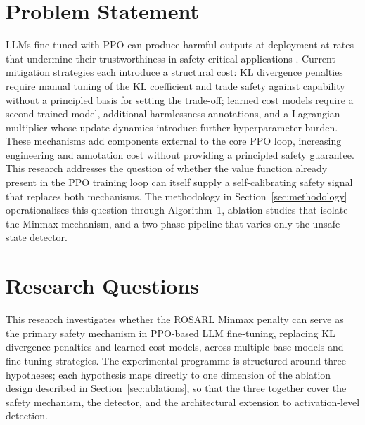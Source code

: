 \documentclass[a4paper,twoside,12pt]{report}
\begin{document}
\section{Problem Statement}
\label{sec:problem-statement}

LLMs fine-tuned with PPO can produce harmful outputs at deployment at rates that undermine
their trustworthiness in safety-critical applications \citep{dai2024saferlhf,
chittepu2025}. Current mitigation strategies each introduce a structural cost: KL
divergence penalties require manual tuning of the KL coefficient and trade safety against
capability without a principled basis for setting the trade-off; learned cost models
require a second trained model, additional harmlessness annotations, and a Lagrangian
multiplier whose update dynamics introduce further hyperparameter burden. These mechanisms
add components external to the core PPO loop, increasing engineering and annotation cost
without providing a principled safety guarantee. This research addresses the question of
whether the value function already present in the PPO training loop can itself supply a
self-calibrating safety signal that replaces both mechanisms. The methodology in
Section~\ref{sec:methodology} operationalises this question through Algorithm~1, ablation
studies that isolate the Minmax mechanism, and a two-phase pipeline that varies only the
unsafe-state detector.

\section{Research Questions}
\label{sec:research-questions}

This research investigates whether the ROSARL Minmax penalty can serve as the primary
safety mechanism in PPO-based LLM fine-tuning, replacing KL divergence penalties and
learned cost models, across multiple base models and fine-tuning strategies. The
experimental programme is structured around three hypotheses; each hypothesis maps
directly to one dimension of the ablation design described in
Section~\ref{sec:ablations}, so that the three together cover the safety mechanism, the
detector, and the architectural extension to activation-level detection.
\end{document}

